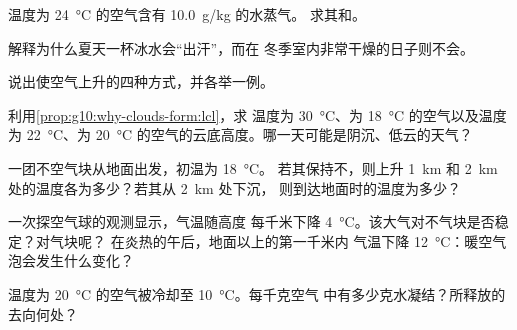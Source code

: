 \begin{exercise}[$\star$]\label{exo:g10:why-clouds-form:3}
温度为 \qty{24}{\degreeCelsius} 的空气含有 \qty{10.0}{g/kg} 的水蒸气。
求其和。
\end{exercise}

\begin{exercise}[$\star$]\label{exo:g10:why-clouds-form:4}
解释为什么夏天一杯冰水会“出汗”，而在
冬季室内非常干燥的日子则不会。
\end{exercise}

\begin{exercise}[$\star$]\label{exo:g10:why-clouds-form:5}
说出使空气上升的四种方式，并各举一例。
\end{exercise}

\begin{exercise}[$\star\star$]\label{exo:g10:why-clouds-form:6}
利用\cref{prop:g10:why-clouds-form:lcl}，求
温度为 \qty{30}{\degreeCelsius}、为
\qty{18}{\degreeCelsius} 的空气以及温度为 \qty{22}{\degreeCelsius}、为
\qty{20}{\degreeCelsius} 的空气的云底高度。哪一天可能是阴沉、低云的天气？
\end{exercise}

\begin{exercise}[$\star\star$]\label{exo:g10:why-clouds-form:7}
一团不空气块从地面出发，初温为 \qty{18}{\degreeCelsius}。
若其保持不，则上升 \qty{1}{km} 和 \qty{2}{km}
处的温度各为多少？若其从 \qty{2}{km} 处下沉，
则到达地面时的温度为多少？
\end{exercise}

\begin{exercise}[$\star\star$]\label{exo:g10:why-clouds-form:8}
一次探空气球的观测显示，气温随高度
每千米下降 \qty{4}{\degreeCelsius}。该大气对不气块是否稳定？对气块呢？
在炎热的午后，地面以上的第一千米内
气温下降 \qty{12}{\degreeCelsius}：暖空气泡会发生什么变化？
\end{exercise}

\begin{exercise}[$\star\star$]\label{exo:g10:why-clouds-form:9}
温度为 \qty{20}{\degreeCelsius} 的空气被冷却至
\qty{10}{\degreeCelsius}。每千克空气
中有多少克水凝结？所释放的去向何处？
\end{exercise}

